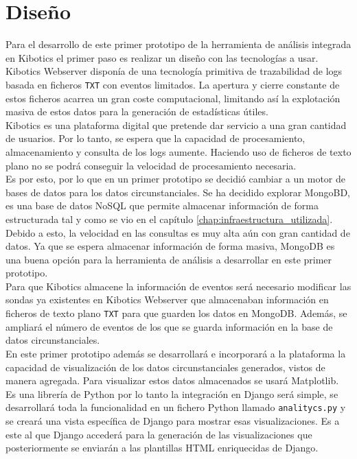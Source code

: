 \documentclass[a4paper, 12pt]{book}
\begin{document}
	\section{Diseño} 
	\label{sec:1_diseno} 
%		

		Para el desarrollo de este primer prototipo de la herramienta de análisis integrada en Kibotics el primer paso es realizar un diseño con las tecnologías a usar. \\
		
		Kibotics Webserver disponía de una tecnología primitiva de trazabilidad de logs basada en ficheros \texttt{TXT} con eventos limitados. La apertura y cierre constante de estos ficheros acarrea un gran coste computacional, limitando así la explotación masiva de estos datos para la generación de estadísticas útiles.\\
		
		Kibotics es una plataforma digital que pretende dar servicio a una gran cantidad de usuarios. Por lo tanto, se espera que la capacidad de procesamiento, almacenamiento y consulta de los logs aumente. Haciendo uso de ficheros de texto plano no se podrá conseguir la velocidad de procesamiento necesaria. \\
		
		Es por esto, por lo que en un primer prototipo se decidió cambiar a un motor de bases de datos para los datos circunstanciales. Se ha decidido explorar MongoBD, es una base de datos NoSQL que permite almacenar información de forma estructurada tal y como se vio en el capítulo \ref{chap:infraestructura_utilizada}. Debido a esto, la velocidad en las consultas es muy alta aún con gran cantidad de datos. Ya que se espera almacenar información de forma masiva, MongoDB es una buena opción para la herramienta de análisis a desarrollar en este primer prototipo. \\

		Para que Kibotics almacene la información de eventos será necesario modificar las sondas ya existentes en Kibotics Webserver que almacenaban información en ficheros de texto plano \texttt{TXT} para que guarden los datos en MongoDB. Además, se ampliará el número de eventos de los que se guarda información en la base de datos circunstanciales. \\
		
		En este primer prototipo además se desarrollará e incorporará a la plataforma la capacidad de visualización de los datos circunstanciales generados, vistos de manera agregada. Para visualizar estos datos almacenados se usará Matplotlib. Es una librería de Python por lo tanto la integración en Django será simple, se desarrollará toda la funcionalidad en un fichero Python llamado \texttt{analitycs.py} y se creará una vista específica de Django para mostrar esas visualizaciones. Es a este al que Django accederá para la generación de las visualizaciones que posteriormente se enviarán a las plantillas HTML enriquecidas de Django. \\
		
\end{document}
